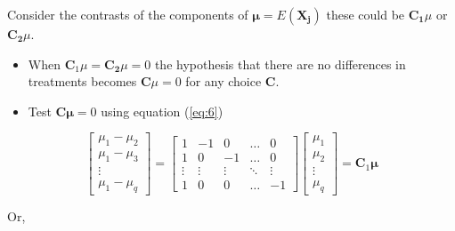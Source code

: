 \documentclass[8pt]{beamer}
\begin{document}
        \begin{frame}
            
            \item Consider the contrasts of the components of $\mathbf{\mu} = E(\mathbf{X_{j}})$ these could be $\mathbf{C_{1}}\mu$ or $\mathbf{C_{2}}\mu$. 
            
            \begin{itemize}
                \item When $\mathbf{C}_{1}\mu = \mathbf{C_{2}}\mu = 0$ the hypothesis that there are no differences in treatments becomes $\mathbf{C}\mu = 0$ for any choice $\mathbf{C}$. 
                \item Test $\mathbf{C\mu} = 0$ using equation (\ref{eq:6})
            \end{itemize}
            
            \begin{displaymath}
                \begin{bmatrix}
                        \mu_{1} - \mu_{2}\\
                        \mu_{1} - \mu_{3} \\
                        \vdots \\
                        \mu_{1} - \mu_{q}
                \end{bmatrix}
                =
                \begin{bmatrix}
                        1 & -1 & 0 &\hdots & 0\\
                        1 & 0 & -1 &\hdots & 0 \\
                        \vdots & \vdots & \vdots & \ddots & \vdots\\
                        1 & 0 & 0 & \hdots & -1
                \end{bmatrix}
                \begin{bmatrix}
                        \mu_{1} \\
                        \mu_{2} \\
                        \vdots \\
                        \mu_{q}
                \end{bmatrix}
                = \mathbf{C}_{1}\mathbf{\mu}
            \end{displaymath}
            
            Or, 
            

\end{frame}
\end{document}
